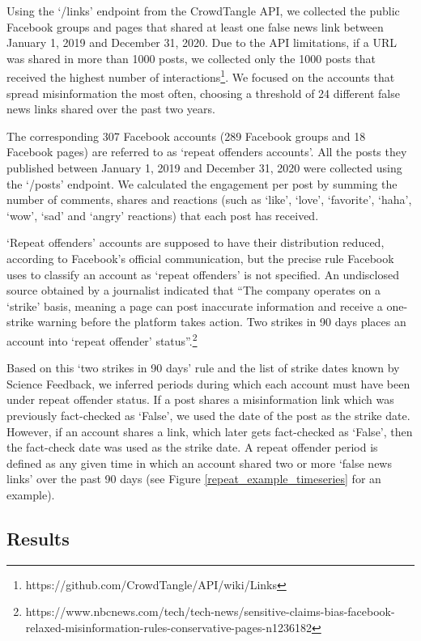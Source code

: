 \documentclass[11pt,a4paper]{article}
\begin{document}
Using the `/links' endpoint from the CrowdTangle API, we collected the public Facebook groups and pages that shared at least one false news link between January 1, 2019 and December 31, 2020. 
Due to the API limitations, if a URL was shared in more than 1000 posts, we collected only the 1000 posts that received the highest number of interactions\footnote{https://github.com/CrowdTangle/API/wiki/Links}. 
We focused on the accounts that spread misinformation the most often, choosing a threshold of 24 different false news links shared over the past two years.  

The corresponding 307 Facebook accounts (289 Facebook groups and 18 Facebook pages) are referred to as `repeat offenders accounts'. 
All the posts they published between January 1, 2019 and December 31, 2020 were collected using the `/posts' endpoint. 
We calculated the engagement per post by summing the number of comments, shares and reactions (such as ‘like’, ‘love’, ‘favorite’, ‘haha’, ‘wow’, ‘sad’ and ‘angry’ reactions) that each post has received.

`Repeat offenders' accounts are supposed to have their distribution reduced, according to Facebook's official communication, but the precise rule Facebook uses to classify an account as `repeat offenders' is not specified. 
An undisclosed source obtained by a journalist indicated that ``The company operates on a `strike' basis, meaning a page can post inaccurate information and receive a one-strike warning before the platform takes action. 
Two strikes in 90 days places an account into `repeat offender' status''.\footnote{https://www.nbcnews.com/tech/tech-news/sensitive-claims-bias-facebook-relaxed-misinformation-rules-conservative-pages-n1236182}

Based on this `two strikes in 90 days' rule and the list of strike dates known by Science Feedback, we inferred periods during which each account must have been under repeat offender status. 
If a post shares a misinformation link which was previously fact-checked as `False', we used the date of the post as the strike date. 
However, if an account shares a link, which later gets fact-checked as `False', then the fact-check date was used as the strike date. 
A repeat offender period is defined as any given time in which an account shared two or more `false news links' over the past 90 days (see Figure \ref{repeat_example_timeseries} for an example).

\subsection{Results}
\end{document}
